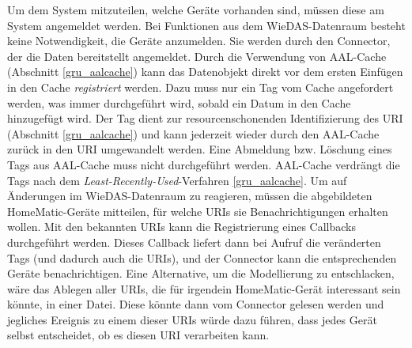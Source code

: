 Um dem System mitzuteilen, welche Geräte vorhanden sind, müssen diese am System angemeldet werden.
Bei Funktionen aus dem WieDAS-Datenraum besteht keine Notwendigkeit, die Geräte anzumelden.
Sie werden durch den Connector, der die Daten bereitstellt angemeldet.
Durch die Verwendung von AAL-Cache (Abschnitt \ref{gru_aalcache}) kann das Datenobjekt
direkt vor dem ersten Einfügen in den Cache \emph{registriert} werden.
Dazu muss nur ein Tag vom Cache angefordert werden, was immer durchgeführt wird, sobald
ein Datum in den Cache hinzugefügt wird.
Der Tag dient zur resourcenschonenden Identifizierung des URI (Abschnitt \ref{gru_aalcache})
und kann jederzeit wieder durch den AAL-Cache zurück in den URI umgewandelt werden.
Eine Abmeldung bzw. Löschung eines Tags aus AAL-Cache muss nicht durchgeführt werden.
AAL-Cache verdrängt die Tags nach dem \emph{Least-Recently-Used}-Verfahren \ref{gru_aalcache}.
Um auf Änderungen im WieDAS-Datenraum zu reagieren, müssen die abgebildeten HomeMatic-Geräte
mitteilen, für welche URIs sie Benachrichtigungen erhalten wollen.
Mit den bekannten URIs kann die Registrierung eines Callbacks durchgeführt werden.
Dieses Callback liefert dann bei Aufruf die veränderten Tags (und dadurch auch die URIs),
und der Connector kann die entsprechenden Geräte benachrichtigen.
Eine Alternative, um die Modellierung zu entschlacken, wäre das Ablegen aller URIs, die
für irgendein HomeMatic-Gerät interessant sein könnte, in einer Datei.
Diese könnte dann vom Connector gelesen werden und jegliches Ereignis zu einem dieser
URIs würde dazu führen, dass jedes Gerät selbst entscheidet, ob es diesen URI
verarbeiten kann.

